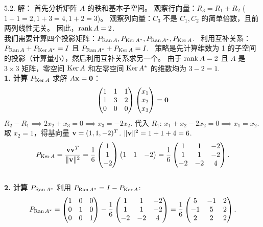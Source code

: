 \begin{exer}
5.2. 解：
首先分析矩阵 $A$ 的秩和基本子空间。
观察行向量：$R_3 = R_1 + R_2$ ($1+1=2, 1+3=4, 1+2=3$)。
观察列向量：$C_3$ 不是 $C_1, C_2$ 的简单倍数，且前两列线性无关。
因此，$\operatorname{rank} A = 2$.~
\\
我们需要计算四个投影矩阵：$P_{\operatorname{Ran} A}, P_{\operatorname{Ker} A^*}, P_{\operatorname{Ran} A^*}, P_{\operatorname{Ker} A}$.~
利用互补关系：$P_{\operatorname{Ran} A} + P_{\operatorname{Ker} A^*} = I$ 且 $P_{\operatorname{Ran} A^*} + P_{\operatorname{Ker} A} = I$.~
策略是先计算维数为 1 的子空间的投影（计算量小），然后利用互补关系求另一个。
由于 $\operatorname{rank} A = 2$ 且 $A$ 是 $3 \times 3$ 矩阵，零空间 $\operatorname{Ker} A$ 和左零空间 $\operatorname{Ker} A^*$ 的维数均为 $3-2=1$.~
\\
\textbf{1. 计算 $P_{\operatorname{Ker} A}$}
求解 $A\mathbf{x} = \mathbf{0}$：
$$ \begin{pmatrix} 1 & 1 & 1 \\ 1 & 3 & 2 \\ 0 & 0 & 0 \end{pmatrix} \begin{pmatrix} x_1 \\ x_2 \\ x_3 \end{pmatrix} = \mathbf{0} $$
$R_2 - R_1 \implies 2x_2 + x_3 = 0 \implies x_3 = -2x_2$.
代入 $R_1$: $x_1 + x_2 - 2x_2 = 0 \implies x_1 = x_2$.
取 $x_2 = 1$，得基向量 $\mathbf{v} = (1, 1, -2)^T$.
$\|\mathbf{v}\|^2 = 1 + 1 + 4 = 6$.
$$ P_{\operatorname{Ker} A} = \frac{\mathbf{v}\mathbf{v}^T}{\|\mathbf{v}\|^2} = \frac{1}{6} \begin{pmatrix} 1 \\ 1 \\ -2 \end{pmatrix} \begin{pmatrix} 1 & 1 & -2 \end{pmatrix} = \frac{1}{6} \begin{pmatrix} 1 & 1 & -2 \\ 1 & 1 & -2 \\ -2 & -2 & 4 \end{pmatrix}. $$
\\
\textbf{2. 计算 $P_{\operatorname{Ran} A^*}$}
利用 $P_{\operatorname{Ran} A^*} = I - P_{\operatorname{Ker} A}$:
$$ P_{\operatorname{Ran} A^*} = \begin{pmatrix} 1 & 0 & 0 \\ 0 & 1 & 0 \\ 0 & 0 & 1 \end{pmatrix} - \frac{1}{6} \begin{pmatrix} 1 & 1 & -2 \\ 1 & 1 & -2 \\ -2 & -2 & 4 \end{pmatrix} = \frac{1}{6} \begin{pmatrix} 5 & -1 & 2 \\ -1 & 5 & 2 \\ 2 & 2 & 2 \end{pmatrix}. $$

\end{exer}

